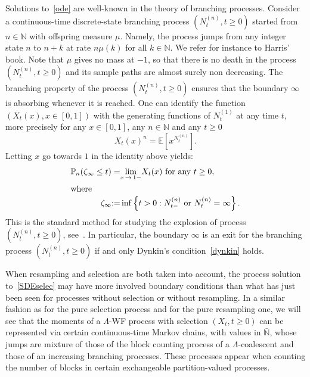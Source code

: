 \documentclass[AHL,Unicode,longabstracts,published]{cedram}
\newcommand{\bbN}{\mathbb{N}}
\newcommand{\bbE}{\mathbb{E}}
\newcommand{\bbP}{\mathbb{P}}
\begin{document}
Solutions to~\eqref{ode} are well-known in the theory of branching processes. Consider a continuous-time discrete-state branching process $(N_t^{(n)},t\geq 0)$ started from\linebreak $n\in \bbN$ with offspring measure $\mu$. Namely, the process jumps from any integer state $n$ to $n+k$ at rate $n\mu(k)$ for all $k\in \bbN$. We refer for instance to Harris' book\linebreak\cite[Chapter~V]{Harris}. Note that $\mu$ gives no mass at $-1$, so that there is no death in the process $(N_t^{(n)},t\geq 0)$ and its sample paths are almost surely non decreasing. The branching property of the process $(N_t^{(n)},t\geq 0)$ ensures that the boundary $\infty$ is absorbing whenever it is reached. One can identify the function $(X_t(x),x \in [0,1])$ with the generating functions of $N^{(1)}_t$ at any time $t$, more precisely for any $x\in [0,1]$, any $n\in \bbN$ and any $t\geq 0$
\begin{equation}\label{dualbranching}
X_t(x)^{n}=\bbE\left[x^{N_t^{(n)}}\right].
\end{equation}
Letting $x$ go towards $1$ in the identity above yields: 
\begin{align*}
\bbP_n(\zeta_\infty\leq t)=& \underset{x\,\rightarrow \,1-}{\lim} X_t(x) \text{ for any }t\geq 0,\\
\intertext{where}
\zeta_\infty{:=}& \inf\left\{t>0: N_{t-}^{(n)} \text{ or } N_t^{(n)}=\infty\right\}.
\end{align*}
This is the standard method for studying the explosion of process $(N_t^{(n)},t\geq 0)$, see~\cite[Chapter~V, Theorem~9.1]{Harris}. In particular, the boundary $\infty$ is an exit for the branching process $(N_t^{(n)},t\geq 0)$ if and only Dynkin's condition~\eqref{dynkin} holds.

When resampling and selection are both taken into account, the process solution to~\eqref{SDEselec} may have more involved boundary conditions than what has just been seen for processes without selection or without resampling. In a similar fashion as for the pure selection process and for the pure resampling one, we will see that the moments of a $\Lambda$-WF process with selection $(X_t,t\geq 0)$ can be represented via certain continuous-time Markov chains, with values in $\bar{\bbN}$, whose jumps are mixture of those of the block counting process of a $\Lambda$-coalescent and those of an increasing branching processes. These processes appear when counting the number of blocks in certain exchangeable partition-valued processes.
\end{document}
